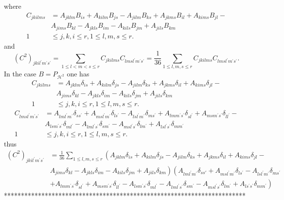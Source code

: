 \documentclass[aps,preprint]{revtex4}%
\begin{document}
where
\begin{align}
C_{jkilms}  &  =A_{jklm}B_{is}+A_{kilm}B_{js}-A_{jilm}B_{ks}+A_{jkms}%
B_{il}+A_{kims}B_{jl}-\nonumber\\
&  A_{jims}B_{kl}-A_{jkls}B_{im}-A_{kils}B_{jm}+A_{jils}B_{km}\nonumber\\
1  &  \leq j,k,i\leq r,1\leq l,m,s\leq r.
\end{align}
and
\begin{equation}
\left(  C^{2}\right)  _{jkil^{\prime}m^{\prime}s^{\prime}}=\sum_{1\leq
l<m<s\leq r}C_{jkilms}C_{lmsl^{\prime}m^{\prime}s^{\prime}}=\frac{1}{36}%
\sum_{1\leq l,m,s\leq r}C_{jkilms}C_{lmsl^{\prime}m^{\prime}s^{\prime}}.
\end{equation}
In the case $B=P_{\mathcal{H}^{2}}$ one has
\begin{align}
C_{jkilms}  &  =A_{jklm}\delta_{is}+A_{kilm}\delta_{js}-A_{jilm}\delta
_{ks}+A_{jkms}\delta_{il}+A_{kims}\delta_{jl}-\nonumber\\
&  A_{jims}\delta_{kl}-A_{jkls}\delta_{im}-A_{kils}\delta_{jm}+A_{jils}%
\delta_{km}\nonumber\\
1  &  \leq j,k,i\leq r,1\leq l,m,s\leq r.
\end{align}%
\begin{align}
C_{lmsl^{\prime}m^{\prime}s^{\prime}}  &  =A_{lml^{\prime}m^{\prime}}%
\delta_{ss^{\prime}}+A_{msl^{\prime}m^{\prime}}\delta_{ls^{\prime}%
}-A_{lsl^{\prime}m^{\prime}}\delta_{ms^{\prime}}+A_{lmm^{\prime}s^{\prime}%
}\delta_{sl^{\prime}}+A_{msm^{\prime}s^{\prime}}\delta_{ll^{\prime}%
}-\nonumber\\
&  A_{lsm^{\prime}s^{\prime}}\delta_{ml^{\prime}}-A_{lml^{\prime}s^{\prime}%
}\delta_{sm^{\prime}}-A_{msl^{\prime}s^{\prime}}\delta_{lm^{\prime}%
}+A_{lsl^{\prime}s^{\prime}}\delta_{mm^{\prime}}\nonumber\\
1  &  \leq j,k,i\leq r,1\leq l,m,s\leq r.
\end{align}
thus%
\begin{align}
\left(  C^{2}\right)  _{jkil^{\prime}m^{\prime}s^{\prime}}  &  =\frac{1}%
{36}\sum_{1\leq l,m,s\leq r}\left(  A_{jklm}\delta_{is}+A_{kilm}\delta
_{js}-A_{jilm}\delta_{ks}+A_{jkms}\delta_{il}+A_{kims}\delta_{jl}-\right. \\
&  \left.  A_{jims}\delta_{kl}-A_{jkls}\delta_{im}-A_{kils}\delta
_{jm}+A_{jils}\delta_{km}\right)  \left(  A_{lml^{\prime}m^{\prime}}%
\delta_{ss\prime}+A_{msl^{\prime}m^{\prime}}\delta_{ls^{\prime}}%
-A_{lsl^{\prime}m^{\prime}}\delta_{ms^{\prime}}\right. \\
&  \left.  +A_{lmm^{\prime}s^{\prime}}\delta_{sl^{\prime}}+A_{msm^{\prime
}s^{\prime}}\delta_{ll^{\prime}}-A_{lsm^{\prime}s^{\prime}}\delta_{ml^{\prime
}}-A_{lml^{\prime}s^{\prime}}\delta_{sm^{\prime}}-A_{msl^{\prime}s^{\prime}%
}\delta_{lm^{\prime}}+A_{ls^{\prime}s^{\prime}}\delta_{mm^{\prime}}\right)
\end{align}
***********************************************************************
\end{document}
